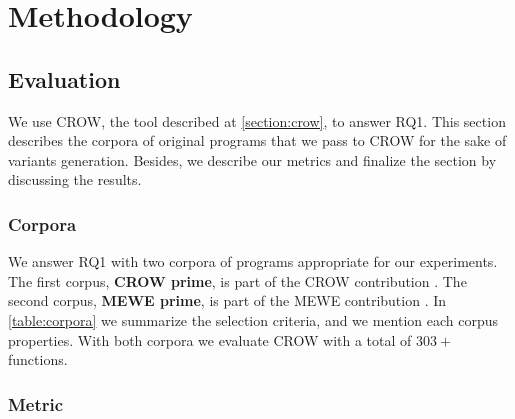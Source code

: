 
\chapter{Methodology} 
\label{chapter:generation}

\newcommand{\libsodiumfunctions}{687}
\newcommand{\qrcodefunctions}{1840}
\newcommand{\allmewefunctions}{\libsodiumfunctions + \qrcodefunctions}

\newcommand{\py}[1]{}




\section{Evaluation}
\label{section:crow:exp_setup}

We use CROW, the tool described at \autoref{section:crow}, to answer RQ1. This section describes the corpora of original programs that we pass to CROW for the sake of variants generation. Besides, we describe our metrics and finalize the section by discussing the results.

\subsection{Corpora}
\label{section:crow:corpora}

We answer RQ1 with two corpora of programs appropriate for our experiments. The first corpus, \textbf{CROW prime}, is part of the CROW contribution \cite{}. The second corpus, \textbf{MEWE prime}, is part of the MEWE contribution \cite{}. In \autoref{table:corpora} we summarize the selection criteria, and we mention each corpus properties. With both corpora we evaluate CROW with a total of $303 + \py{\allmewefunctions}$ functions. 

\subsection{Metric}
 
